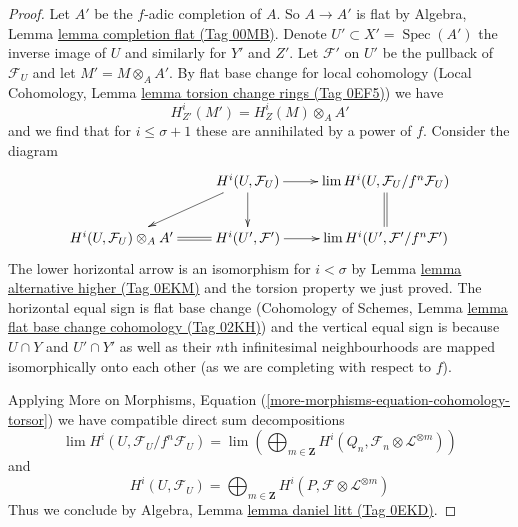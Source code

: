 \documentclass{amsart}
\theoremstyle{plain}
\theoremstyle{definition}
\theoremstyle{remark}
\numberwithin{equation}{subsection}
\def\lim{\mathop{\mathrm{lim}}\nolimits}
\def\Spec{\mathop{\mathrm{Spec}}}
\begin{document}
\begin{proof}
\medskip\noindent
Let $A'$ be the $f$-adic completion of $A$. So $A \to A'$ is flat by
Algebra, Lemma \href{https://stacks.math.columbia.edu/tag/00MB}{lemma completion flat (Tag 00MB)}.
Denote $U' \subset X' = \Spec(A')$ the inverse image of
$U$ and similarly for $Y'$ and $Z'$. Let $\mathcal{F}'$
on $U'$ be the pullback of $\mathcal{F}_U$ and let
$M' = M \otimes_A A'$.
By flat base change for local cohomology
(Local Cohomology, Lemma \href{https://stacks.math.columbia.edu/tag/0EF5}{lemma torsion change rings (Tag 0EF5)})
we have
$$
H^i_{Z'}(M') = H^i_Z(M) \otimes_A A'
$$
and we find that for $i \leq \sigma + 1$
these are annihilated by a power of $f$. Consider the diagram
$$
\xymatrix{
& H^i(U, \mathcal{F}_U) \ar[ld] \ar[d] \ar[r] &
\lim H^i(U, \mathcal{F}_U/f^n\mathcal{F}_U) \ar@{=}[d] \\
H^i(U, \mathcal{F}_U) \otimes_A A' \ar@{=}[r] &
H^i(U', \mathcal{F}') \ar[r] &
\lim H^i(U', \mathcal{F}'/f^n\mathcal{F}')
}
$$
The lower horizontal arrow is an isomorphism for $i < \sigma$ by
Lemma \href{https://stacks.math.columbia.edu/tag/0EKM}{lemma alternative higher (Tag 0EKM)} and the torsion
property we just proved. The horizontal equal sign is flat base change
(Cohomology of Schemes, Lemma \href{https://stacks.math.columbia.edu/tag/02KH}{lemma flat base change cohomology (Tag 02KH)})
and the vertical equal sign is because $U \cap Y$ and $U' \cap Y'$
as well as their $n$th infinitesimal neighbourhoods
are mapped isomorphically onto each other (as we are
completing with respect to $f$).

\medskip\noindent
Applying More on Morphisms, Equation
(\ref{more-morphisms-equation-cohomology-torsor})
we have compatible direct sum decompositions
$$
\lim H^i(U, \mathcal{F}_U/f^n\mathcal{F}_U) =
\lim
\left(
\bigoplus\nolimits_{m \in \mathbf{Z}}
H^i(Q_n, \mathcal{F}_n \otimes \mathcal{L}^{\otimes m})
\right)
$$
and
$$
H^i(U, \mathcal{F}_U) =
\bigoplus\nolimits_{m \in \mathbf{Z}}
H^i(P, \mathcal{F} \otimes \mathcal{L}^{\otimes m})
$$
Thus we conclude by Algebra, Lemma \href{https://stacks.math.columbia.edu/tag/0EKD}{lemma daniel litt (Tag 0EKD)}.
\end{proof}
\end{document}
